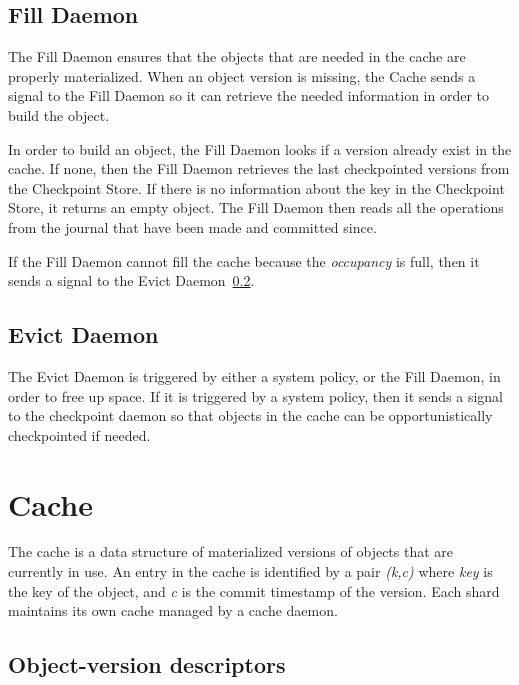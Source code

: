 \documentclass[twoside]{article}
\begin{document}
\subsection{Fill Daemon}
\label{sec:fill-daemon}

The Fill Daemon ensures that the objects that are needed in the cache are properly
materialized. 
When an object version is missing, the Cache sends a signal to the Fill Daemon so it 
can retrieve the needed information in order to build the object.

In order to build an object, the Fill Daemon looks if a version
already exist in the cache. 
If none, then the Fill Daemon retrieves the last checkpointed versions 
from the Checkpoint Store.
If there is no information about the key in the Checkpoint Store, it returns
an empty object.
The Fill Daemon then reads all the operations from the journal that have been made and committed
since.


If the Fill Daemon cannot fill the cache because the \emph{occupancy}
is full, then it sends a signal to the Evict Daemon~\ref{sec:evict-daemon}.

\subsection{Evict Daemon}
\label{sec:evict-daemon}
 
The Evict Daemon is triggered by either a system policy, or the Fill Daemon, in 
order to free up space. 
If it is triggered by a system policy, then it sends a signal to the 
checkpoint daemon so that objects in the cache can be opportunistically
checkpointed if needed.


\section{Cache}
\label{sec:cache}

The cache is a data structure of materialized versions of objects that are 
currently in use. 
An entry in the cache is identified by a pair \emph{(k,c)} where
\emph{key} is the key of the object, and \emph{c} is the commit timestamp of the
version. 
Each shard maintains its own cache managed by a cache daemon.

\subsection{Object-version descriptors}
\label{sec:objects}
\end{document}
